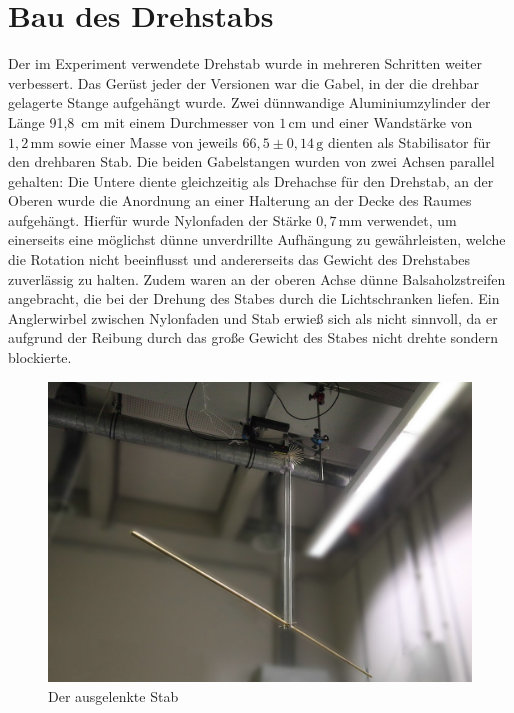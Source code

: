 \documentclass[halfparskip, 11pt]{scrartcl}
\newcommand{\unit}[1]{\ensuremath{\,\mathrm{#1}}} %
\begin{document}
\FloatBarrier
\section{Bau des Drehstabs} %


Der im Experiment verwendete Drehstab wurde in mehreren Schritten weiter verbessert. Das Ger\"ust jeder der Versionen war die Gabel, in der die drehbar gelagerte Stange aufgeh\"angt wurde. Zwei d\"unnwandige Aluminiumzylinder der L\"ange 91,8 \unit{cm} mit einem Durchmesser von $1\unit{cm}$ und einer Wandstärke von $1,2\unit{mm}$ sowie einer Masse von jeweils $66,5\pm 0,14\unit{g}$ dienten als Stabilisator für den drehbaren Stab. Die beiden Gabelstangen wurden von zwei Achsen parallel gehalten: Die Untere diente gleichzeitig als Drehachse f\"ur den Drehstab, an der Oberen wurde die Anordnung an einer Halterung an der Decke des Raumes aufgeh\"angt. Hierf\"ur wurde Nylonfaden der St\"arke $0,7\unit{mm}$
 verwendet, um einerseits eine m\"oglichst d\"unne unverdrillte Aufh\"angung zu gew\"ahrleisten, welche die Rotation nicht beeinflusst und andererseits das Gewicht des Drehstabes zuverl\"assig zu halten. Zudem waren an der oberen Achse d\"unne Balsaholzstreifen angebracht, die bei der Drehung des Stabes durch die Lichtschranken liefen. Ein Anglerwirbel zwischen Nylonfaden und Stab erwieß sich als nicht sinnvoll, da er aufgrund der Reibung durch das große Gewicht des Stabes nicht drehte sondern blockierte.

\begin{figure}[ht]
\centering
\includegraphics[width=1.\textwidth]{stab-fertig.jpg}
\caption{Der ausgelenkte Stab}
\label{stab-fertig}
\end{figure}
\end{document}
